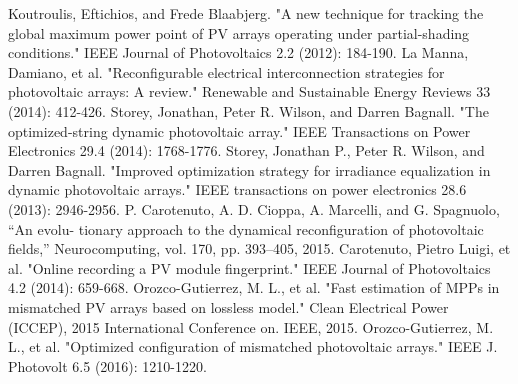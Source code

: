 \documentclass[conference]{IEEEtran}
\begin{document}
\begin{thebibliography}{00}
 Koutroulis, Eftichios, and Frede Blaabjerg. "A new technique for tracking the global maximum power point of PV arrays operating under partial-shading conditions." IEEE Journal of Photovoltaics 2.2 (2012): 184-190.
 La Manna, Damiano, et al. "Reconfigurable electrical interconnection strategies for photovoltaic arrays: A review." Renewable and Sustainable Energy Reviews 33 (2014): 412-426.
Storey, Jonathan, Peter R. Wilson, and Darren Bagnall. "The optimized-string dynamic photovoltaic array." IEEE Transactions on Power Electronics 29.4 (2014): 1768-1776.
 Storey, Jonathan P., Peter R. Wilson, and Darren Bagnall. "Improved optimization strategy for irradiance equalization in dynamic photovoltaic arrays." IEEE transactions on power electronics 28.6 (2013): 2946-2956.
 P. Carotenuto, A. D. Cioppa, A. Marcelli, and G. Spagnuolo, “An evolu- tionary approach to the dynamical reconfiguration of photovoltaic fields,” Neurocomputing, vol. 170, pp. 393–405, 2015.
 Carotenuto, Pietro Luigi, et al. "Online recording a PV module fingerprint." IEEE Journal of Photovoltaics 4.2 (2014): 659-668.
 Orozco-Gutierrez, M. L., et al. "Fast estimation of MPPs in mismatched PV arrays based on lossless model." Clean Electrical Power (ICCEP), 2015 International Conference on. IEEE, 2015.
 Orozco-Gutierrez, M. L., et al. "Optimized configuration of mismatched photovoltaic arrays." IEEE J. Photovolt 6.5 (2016): 1210-1220.
  
\end{thebibliography}
\end{document}
